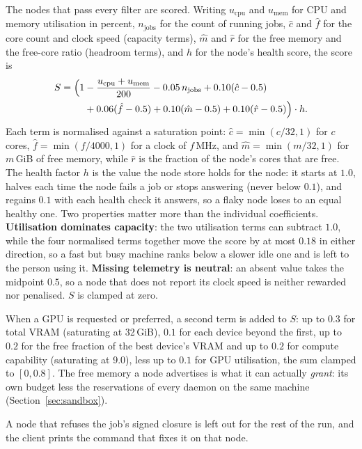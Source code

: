 The nodes that pass every filter are scored. Writing $u_{\mathrm{cpu}}$ and
$u_{\mathrm{mem}}$ for CPU and memory utilisation in percent, $n_{\mathrm{jobs}}$
for the count of running jobs, $\hat{c}$ and $\hat{f}$ for the core count and
clock speed (capacity terms), $\hat{m}$ and $\hat{r}$ for the free memory and
the free-core ratio (headroom terms), and $h$ for the node's health score, the
score is
\begin{equation}
\label{eq:score}
\begin{split}
S = \Bigl(1 &- \frac{u_{\mathrm{cpu}} + u_{\mathrm{mem}}}{200}
     - 0.05\,n_{\mathrm{jobs}} + 0.10(\hat{c}-0.5) \\
    &+ 0.06(\hat{f}-0.5) + 0.10(\hat{m}-0.5) + 0.10(\hat{r}-0.5)\Bigr)\cdot h .
\end{split}
\end{equation}
Each term is normalised against a saturation point: $\hat{c} = \min(c/32, 1)$
for $c$ cores, $\hat{f} = \min(f/4000, 1)$ for a clock of $f$\,MHz, and
$\hat{m} = \min(m/32, 1)$ for $m$\,GiB of free memory, while $\hat{r}$ is the
fraction of the node's cores that are free. The health factor $h$ is the value
the node store holds for the node: it starts at $1.0$, halves each time the node
fails a job or stops answering (never below $0.1$), and regains $0.1$ with each
health check it answers, so a flaky node loses to an equal healthy one. Two properties matter more than the individual coefficients.
\textbf{Utilisation dominates capacity}: the two utilisation terms can subtract
$1.0$, while the four normalised terms together move the score by at most $0.18$
in either direction, so a fast but busy machine ranks below a slower idle one
and is left to the person using it. \textbf{Missing telemetry is neutral}: an
absent value takes the midpoint $0.5$, so a node that does not report its clock
speed is neither rewarded nor penalised. $S$ is clamped at zero.

When a GPU is requested or preferred, a second term is added to $S$: up to
$0.3$ for total VRAM (saturating at 32\,GiB), $0.1$ for each device beyond the
first, up to $0.2$ for the free fraction of the best device's VRAM and up to
$0.2$ for compute capability (saturating at 9.0), less up to $0.1$ for GPU
utilisation, the sum clamped to $[0, 0.8]$. The free memory a node advertises is what it can actually
\emph{grant}: its own budget less the reservations of every daemon on the same
machine (Section~\ref{sec:sandbox}).

A node that refuses the job's signed closure is left out for the rest of the
run, and the client prints the command that fixes it on that node.

